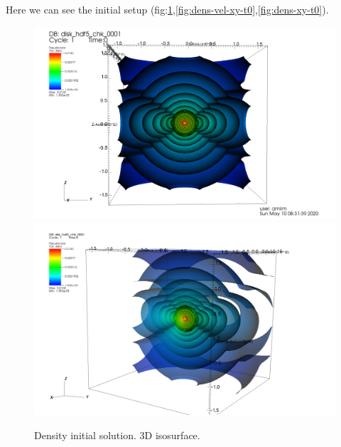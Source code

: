 \documentclass[12pt, a4paper]{article}
\begin{document}
Here we can see the initial setup (fig:\ref{fig:dens-3d-t0},\ref{fig:dens-vel-xy-t0},\ref{fig:dens-xy-t0}).
\begin{figure}[ht!]
    \begin{center}
        \includegraphics[width=1.0\textwidth]{density_t0_3d.png}
        \includegraphics[width=1.0\textwidth]{density_t0_3d_side.png}
    \end{center}
    \caption{
        Density initial solution. 3D isosurface. 
    }\label{fig:dens-3d-t0}
\end{figure}
\end{document}
